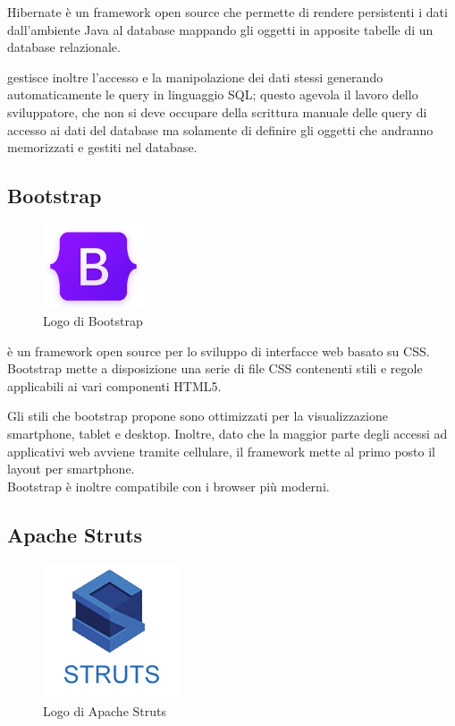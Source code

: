 \noindent Hibernate è un framework open source che permette di  rendere persistenti i dati dall'ambiente Java al database mappando gli oggetti in apposite tabelle di un database relazionale.

\setlength{\parskip}{3ex}

\ap{{[b]}} gestisce inoltre l'accesso e la manipolazione dei dati stessi generando automaticamente le query in linguaggio SQL; questo agevola il lavoro dello sviluppatore, che non si deve occupare della scrittura manuale delle query di accesso ai dati del database ma solamente di definire gli oggetti che andranno memorizzati e gestiti nel database.

\subsection{Bootstrap}

\begin{figure}[!h]
	\centering
	\includegraphics[width=3cm]{../images/Bootstrap-logo.png}
	\caption{Logo di Bootstrap}
\end{figure}

\ap{{[b]}} è un framework open source per lo sviluppo di interfacce web basato su CSS. Bootstrap mette a disposizione una serie di file CSS contenenti stili e regole applicabili ai vari componenti HTML5.

\setlength{\parskip}{3ex}

\noindent Gli stili che bootstrap propone sono ottimizzati per la visualizzazione smartphone, tablet e desktop. Inoltre, dato che la maggior parte degli accessi ad applicativi web avviene tramite cellulare, il framework mette al primo posto il layout per smartphone.\\
Bootstrap è inoltre compatibile con i browser più moderni.

\pagebreak

\subsection{Apache Struts}

\begin{figure}[!h]
	\centering
	\includegraphics[width=4cm]{../images/Struts-logo.png}
	\caption{Logo di Apache Struts}
\end{figure}

